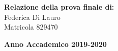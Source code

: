 \begin{titlepage}
        \begin{flushright}
            {\large \textbf{Relazione della prova finale di:}} \\
            \large{Federica Di Lauro} \\
            \large{Matricola 829470} 
        \end{flushright}
        
        \vspace{40mm}
        \begin{center}
            {\large{\bf Anno Accademico 2019-2020}}
        \end{center}

        \restoregeometry
        
    \end{titlepage}
    